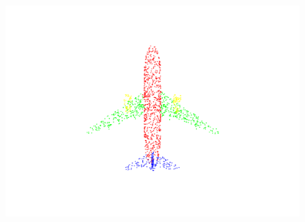 \begin{figure}[htbp]
\begin{minipage}{0.25\textwidth}
    \end{minipage}
    \hfill
    \begin{minipage}{0.25\textwidth}
        \centering
        \includegraphics[width=\textwidth]{fig/supplement/part_segmentation/airplane/airplane02.pdf}
    \end{minipage}
    \hfill

    \vspace{0.5em}


\end{figure}
